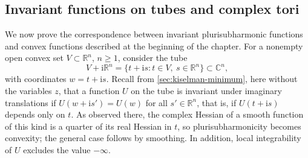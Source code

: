\subsection{Invariant functions on tubes and complex tori}
\label{sec:invariant-psh-convexity}
We now prove the correspondence between invariant plurisubharmonic functions and convex functions described at the beginning of the chapter. For a nonempty open convex set $V\subset\mathbb R^n$, $n\geq1$, consider the tube
\[
 V+\mathrm i\mathbb R^n=\{t+\mathrm is:t\in V,\ s\in\mathbb R^n\}\subset\mathbb C^n,
\]
with coordinates $w=t+\mathrm is$. Recall from \cref{sec:kiselman-minimum}, here without the variables $z$, that a function $U$ on the tube is invariant under imaginary translations if $U(w+\mathrm is')=U(w)$ for all $s'\in\mathbb R^n$, that is, if $U(t+\mathrm is)$ depends only on $t$. As observed there, the complex Hessian of a smooth function of this kind is a quarter of its real Hessian in $t$, so plurisubharmonicity becomes convexity; the general case follows by smoothing. In addition, local integrability of $U$ excludes the value $-\infty$.

